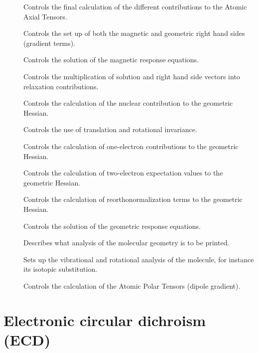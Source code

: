 \begin{description}
\item[] Controls the final calculation of the different
contributions to the Atomic Axial Tensors.
\item[] Controls the set up of both the magnetic and
geometric right hand sides (gradient terms).
\item[] Controls the solution of the magnetic response
equations.
\item[] Controls the multiplication of solution and right hand
side vectors into relaxation contributions.
\item[] Controls the calculation of the nuclear
contribution to the geometric Hessian.
\item[] Controls the use of translation and rotational invariance.
\item[] Controls the calculation of one-electron
contributions to the geometric Hessian.
\item[] Controls the calculation of two-electron
expectation values to the geometric Hessian.
\item[] Controls the calculation of reorthonormalization
terms to the geometric Hessian.
\item[] Controls the solution of the geometric response equations.
\item[] Describes what analysis of the molecular geometry
is to be printed.
\item[] Sets up the vibrational and rotational analysis of the
molecule, for instance its isotopic substitution.
\item[] Controls the calculation of the Atomic Polar
Tensors (dipole gradient).
\end{description}

\section{Electronic circular dichroism (ECD)}\label{sec:ecd}

\begin{center}
\end{center}

